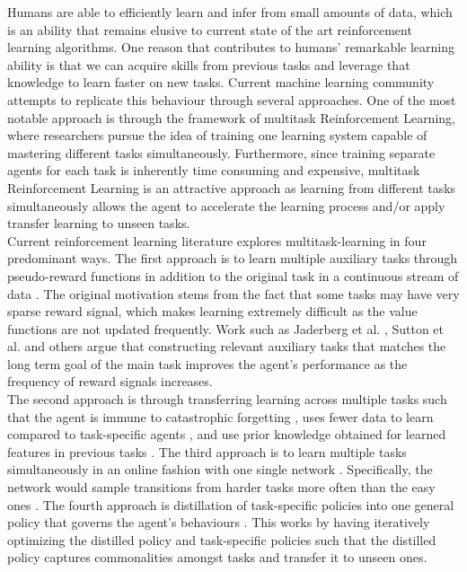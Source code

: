 \documentclass[12pt]{report}
\begin{document}
Humans are able to efficiently learn and infer from small amounts of data, which is an ability that remains elusive to current state of the art reinforcement learning algorithms. One reason that contributes to humans' remarkable learning ability is that we can acquire skills from previous tasks and leverage that knowledge to learn faster on new tasks. Current machine learning community attempts to replicate this behaviour through several approaches. One of the most notable approach is through the framework of multitask Reinforcement Learning, where researchers pursue the idea of training one learning system capable of mastering different tasks simultaneously. Furthermore, since training separate agents for each task is inherently time consuming and expensive, multitask Reinforcement Learning is an attractive approach as learning from different tasks simultaneously allows the agent to accelerate the learning process and/or apply transfer learning to unseen tasks.\\


Current reinforcement learning literature explores multitask-learning in four predominant ways. The first approach is to learn multiple auxiliary tasks through pseudo-reward functions in addition to the original task in a continuous stream of data \cite{jaderberg2016reinforcement} \cite{hessel2019multi}. The original motivation stems from the fact that some tasks may have very sparse reward signal, which makes learning extremely difficult as the value functions are not updated frequently. Work such as Jaderberg et al. \cite{jaderberg2016reinforcement}, Sutton et al. \cite{sutton2011horde} and others \cite{lample2017playing} \cite{schaul2015universal} argue that constructing relevant auxiliary tasks that matches the long term goal of the main task improves the agent's performance as the frequency of reward signals increases.\\

The second approach is through transferring learning across multiple tasks such that the agent is immune to catastrophic forgetting \cite{rusu2016progressive}, uses fewer data to learn compared to task-specific agents \cite{mitchell1993explanation}, and use prior knowledge obtained for learned features in previous tasks \cite{rusu2016progressive}. The third approach is to learn multiple tasks simultaneously in an online fashion with one single network \cite{hessel2019multi}. Specifically, the network would sample transitions from harder tasks more often than the easy ones \cite{sharma2017learning}. The fourth approach is distillation of task-specific policies into one general policy that governs the agent's behaviours \cite{teh2017distral} \cite{schmitt2018kickstarting} \cite{parisotto2015actor}. This works by having iteratively optimizing the distilled policy and task-specific policies such that the distilled policy captures commonalities amongst tasks and transfer it to unseen ones.\\
\end{document}
